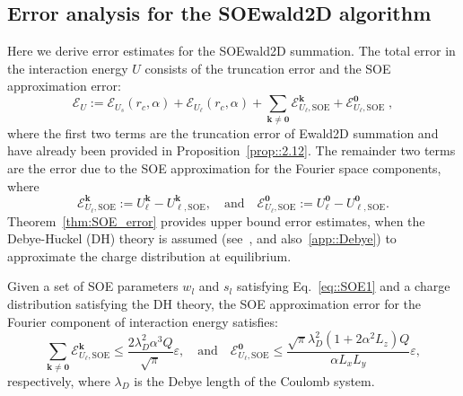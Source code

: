 \subsection{Error analysis for the SOEwald2D algorithm}\label{subsec::errSOEwald2D}
Here we derive error estimates for the SOEwald2D summation. 
The total error in the interaction energy $U$ consists of the truncation error and the SOE approximation error:
\begin{equation}
	\mathscr{E}_{U} := \mathscr{E}_{U_{s}}(r_c, \alpha) + \mathscr{E}_{U_{\ell}}(r_c, \alpha) + \sum_{\bm{k}\neq\bm{0}}\mathscr{E}_{U_{\ell},\text{SOE}}^{ \bm{k}} + \mathscr{E}_{U_{\ell},\text{SOE}}^{\bm{0}}\;,
\end{equation}
where the first two terms are the truncation error of Ewald2D summation and have already been provided in Proposition~\ref{prop::2.12}. 
The remainder two terms are the error due to the SOE approximation for the Fourier space components, where
\begin{equation}
	\mathscr{E}_{U_{\ell},\text{SOE}}^{\bm{k}}:=U_{\ell}^{\bm{k}}-U_{\ell,\text{SOE}}^{\bm{k}},\quad \text{and}\quad \mathscr{E}_{U_{\ell},\text{SOE}}^{\bm{0}}:=U_{\ell}^{\bm{0}}- U_{\ell,\text{SOE}}^{\bm{0}}.
\end{equation}
Theorem~\ref{thm:SOE_error} provides  upper bound error estimates, when the Debye-H$\ddot{\text{u}}$ckel (DH) theory is assumed (see~\cite{levin2002electrostatic}, and also~\ref{app::Debye}) to approximate the charge distribution at equilibrium.

\begin{thm}
	\label{thm:SOE_error}
	Given a set of SOE parameters $w_l$ and $s_l$ satisfying Eq.~\eqref{eq::SOE1} and a charge distribution satisfying the DH theory, the SOE approximation error for the Fourier component of interaction energy satisfies:
	\begin{equation}\sum_{\bm{k}\neq\bm{0}}\mathscr{E}_{U_{\ell},\text{SOE}}^{\bm{k}} \leq \frac{2 \lambda_D^2 \alpha^3Q}{\sqrt{\pi}}\varepsilon,
		\quad \text{and} \quad
		\mathscr{E}_{U_{\ell},\text{SOE}}^{\bm{0}} \leq \frac{\sqrt{\pi} \lambda_D^2 (1+2\alpha^2L_z)Q}{\alpha L_xL_y}\varepsilon,
		\label{eq::51}
	\end{equation}
	respectively, where $\lambda_D$ is the Debye length of the Coulomb system. 
\end{thm}

